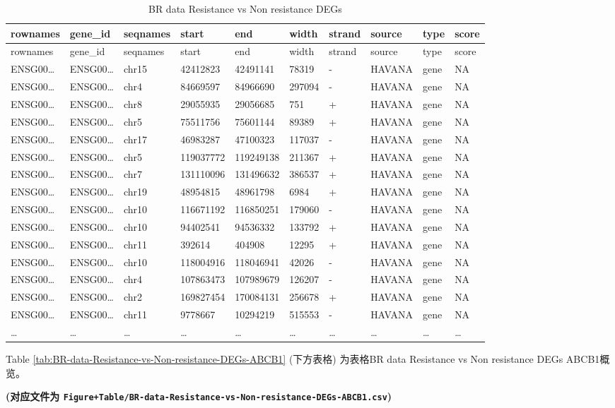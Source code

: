 \documentclass[
]{article}
\begin{document}
\begin{longtable}[]{@{}llllllllll@{}}
\caption{\label{tab:BR-data-Resistance-vs-Non-resistance-DEGs}BR data Resistance vs Non resistance DEGs}\tabularnewline
\toprule
rownames & gene\_id & seqnames & start & end & width & strand & source & type & score\tabularnewline
\midrule
\endfirsthead
\toprule
rownames & gene\_id & seqnames & start & end & width & strand & source & type & score\tabularnewline
\midrule
\endhead
ENSG00\ldots{} & ENSG00\ldots{} & chr15 & 42412823 & 42491141 & 78319 & - & HAVANA & gene & NA\tabularnewline
ENSG00\ldots{} & ENSG00\ldots{} & chr4 & 84669597 & 84966690 & 297094 & - & HAVANA & gene & NA\tabularnewline
ENSG00\ldots{} & ENSG00\ldots{} & chr8 & 29055935 & 29056685 & 751 & + & HAVANA & gene & NA\tabularnewline
ENSG00\ldots{} & ENSG00\ldots{} & chr5 & 75511756 & 75601144 & 89389 & + & HAVANA & gene & NA\tabularnewline
ENSG00\ldots{} & ENSG00\ldots{} & chr17 & 46983287 & 47100323 & 117037 & - & HAVANA & gene & NA\tabularnewline
ENSG00\ldots{} & ENSG00\ldots{} & chr5 & 119037772 & 119249138 & 211367 & + & HAVANA & gene & NA\tabularnewline
ENSG00\ldots{} & ENSG00\ldots{} & chr7 & 131110096 & 131496632 & 386537 & + & HAVANA & gene & NA\tabularnewline
ENSG00\ldots{} & ENSG00\ldots{} & chr19 & 48954815 & 48961798 & 6984 & + & HAVANA & gene & NA\tabularnewline
ENSG00\ldots{} & ENSG00\ldots{} & chr10 & 116671192 & 116850251 & 179060 & - & HAVANA & gene & NA\tabularnewline
ENSG00\ldots{} & ENSG00\ldots{} & chr10 & 94402541 & 94536332 & 133792 & + & HAVANA & gene & NA\tabularnewline
ENSG00\ldots{} & ENSG00\ldots{} & chr11 & 392614 & 404908 & 12295 & + & HAVANA & gene & NA\tabularnewline
ENSG00\ldots{} & ENSG00\ldots{} & chr10 & 118004916 & 118046941 & 42026 & - & HAVANA & gene & NA\tabularnewline
ENSG00\ldots{} & ENSG00\ldots{} & chr4 & 107863473 & 107989679 & 126207 & - & HAVANA & gene & NA\tabularnewline
ENSG00\ldots{} & ENSG00\ldots{} & chr2 & 169827454 & 170084131 & 256678 & + & HAVANA & gene & NA\tabularnewline
ENSG00\ldots{} & ENSG00\ldots{} & chr11 & 9778667 & 10294219 & 515553 & - & HAVANA & gene & NA\tabularnewline
\ldots{} & \ldots{} & \ldots{} & \ldots{} & \ldots{} & \ldots{} & \ldots{} & \ldots{} & \ldots{} & \ldots{}\tabularnewline
\bottomrule
\end{longtable}

Table \ref{tab:BR-data-Resistance-vs-Non-resistance-DEGs-ABCB1} (下方表格) 为表格BR data Resistance vs Non resistance DEGs ABCB1概览。

\textbf{(对应文件为 \texttt{Figure+Table/BR-data-Resistance-vs-Non-resistance-DEGs-ABCB1.csv})}
\end{document}
